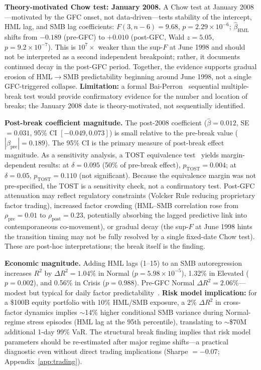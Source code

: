 \documentclass[sigconf,anonymous]{acmart}
\begin{document}
\textbf{Theory-motivated Chow test: January 2008.}
A Chow test at January 2008---motivated by the GFC onset, not data-driven---tests
stability of the intercept, HML lag, and SMB lag coefficients:
$F(3,n-6) = 9.68$, $p = 2.29 \times 10^{-6}$; $\hat{\beta}_{\text{HML}}$ shifts
from $-0.189$ (pre-GFC) to $+0.010$ (post-GFC, Wald $z = 5.05$, $p = 9.2 \times 10^{-7}$).
This is $10^{7}\times$ weaker than the sup-$F$ at June 1998 and should not be interpreted
as a second independent breakpoint; rather, it documents continued decay in the
post-GFC period.
Together, the evidence supports gradual erosion of HML$\to$SMB
predictability beginning around June 1998, not a single GFC-triggered collapse.
\textbf{Limitation:} a formal Bai-Perron~\cite{bai2003computation} sequential
multiple-break test would provide confirmatory evidence for the number and location
of breaks; the January 2008 date is theory-motivated, not sequentially identified.

\textbf{Post-break coefficient magnitude.}
The post-2008 coefficient ($\hat{\beta} = 0.012$, SE $= 0.031$, 95\% CI $[-0.049, 0.073]$)
is small relative to the pre-break value ($|\beta_{\text{pre}}| = 0.189$).
The 95\% CI is the primary measure of post-break effect magnitude.
As a sensitivity analysis, a TOST equivalence test~\cite{schuirmann1987comparison}
yields margin-dependent results: at $\delta = 0.095$ (50\% of pre-break effect),
$p_{\text{TOST}} = 0.004$; at $\delta = 0.05$, $p_{\text{TOST}} = 0.110$
(not significant). Because the equivalence margin was not pre-specified,
the TOST is a sensitivity check, not a confirmatory test.
Post-GFC attenuation may reflect regulatory constraints
(Volcker Rule reducing proprietary factor trading), increased factor crowding
(HML--SMB correlation rose from $\rho_{\text{pre}} = 0.01$ to $\rho_{\text{post}} = 0.23$,
potentially absorbing the lagged predictive link into contemporaneous co-movement),
or gradual decay (the sup-$F$ at June 1998 hints the transition timing
may not be fully resolved by a single fixed-date Chow test).
These are post-hoc interpretations; the break itself is the finding.

\textbf{Economic magnitude.}
Adding HML lags (1--15) to an SMB autoregression increases $R^2$ by
$\Delta R^2 = 1.04\%$ in Normal ($p = 5.98 \times 10^{-5}$),
1.32\% in Elevated ($p = 0.002$), and 0.56\% in Crisis ($p = 0.988$).
Pre-GFC Normal $\Delta R^2 = 2.06\%$---modest but typical for daily
factor predictability~\cite{ehsani2022factor}.
\textbf{Risk model implication:} for a \$100B equity portfolio with
10\% HML/SMB exposure, a 2\% $\Delta R^2$ in cross-factor dynamics
implies $\sim$14\% higher conditional SMB variance during Normal-regime
stress episodes (HML lag at the 95th percentile), translating to
$\sim$\$70M additional 1-day 99\% VaR.
The structural break finding implies that risk model parameters
should be re-estimated after major regime shifts---a practical diagnostic
even without direct trading implications (Sharpe $= -0.07$;
Appendix~\ref{app:trading}).
\end{document}
